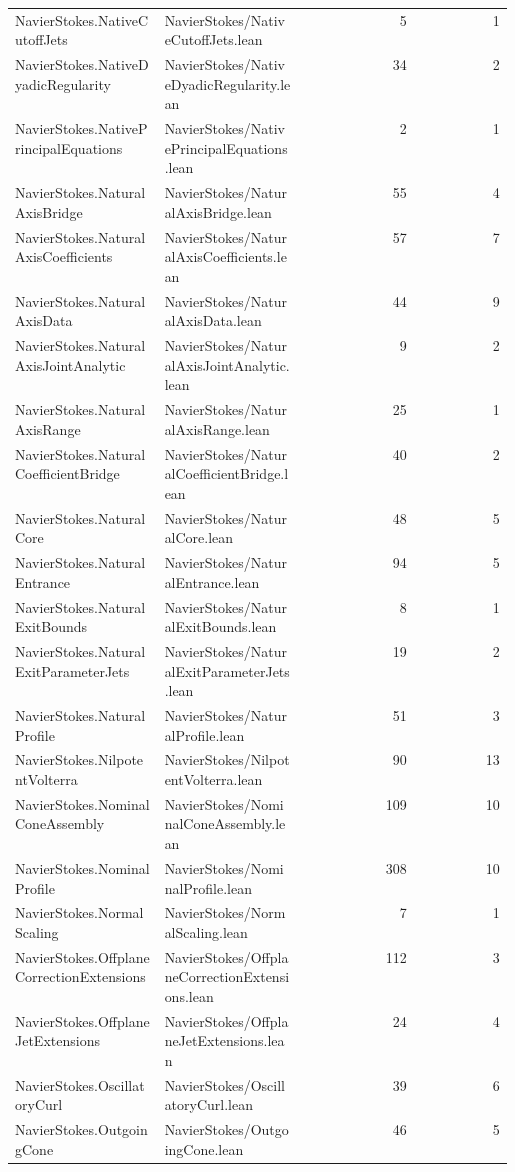 \begin{longtable}{p{0.30\linewidth}p{0.28\linewidth}rr}
NavierStokes.NativeCutoffJets & NavierStokes/NativeCutoffJets.lean & 5 & 1\\
NavierStokes.NativeDyadicRegularity & NavierStokes/NativeDyadicRegularity.lean & 34 & 2\\
NavierStokes.NativePrincipalEquations & NavierStokes/NativePrincipalEquations.lean & 2 & 1\\
NavierStokes.NaturalAxisBridge & NavierStokes/NaturalAxisBridge.lean & 55 & 4\\
NavierStokes.NaturalAxisCoefficients & NavierStokes/NaturalAxisCoefficients.lean & 57 & 7\\
NavierStokes.NaturalAxisData & NavierStokes/NaturalAxisData.lean & 44 & 9\\
NavierStokes.NaturalAxisJointAnalytic & NavierStokes/NaturalAxisJointAnalytic.lean & 9 & 2\\
NavierStokes.NaturalAxisRange & NavierStokes/NaturalAxisRange.lean & 25 & 1\\
NavierStokes.NaturalCoefficientBridge & NavierStokes/NaturalCoefficientBridge.lean & 40 & 2\\
NavierStokes.NaturalCore & NavierStokes/NaturalCore.lean & 48 & 5\\
NavierStokes.NaturalEntrance & NavierStokes/NaturalEntrance.lean & 94 & 5\\
NavierStokes.NaturalExitBounds & NavierStokes/NaturalExitBounds.lean & 8 & 1\\
NavierStokes.NaturalExitParameterJets & NavierStokes/NaturalExitParameterJets.lean & 19 & 2\\
NavierStokes.NaturalProfile & NavierStokes/NaturalProfile.lean & 51 & 3\\
NavierStokes.NilpotentVolterra & NavierStokes/NilpotentVolterra.lean & 90 & 13\\
NavierStokes.NominalConeAssembly & NavierStokes/NominalConeAssembly.lean & 109 & 10\\
NavierStokes.NominalProfile & NavierStokes/NominalProfile.lean & 308 & 10\\
NavierStokes.NormalScaling & NavierStokes/NormalScaling.lean & 7 & 1\\
NavierStokes.OffplaneCorrectionExtensions & NavierStokes/OffplaneCorrectionExtensions.lean & 112 & 3\\
NavierStokes.OffplaneJetExtensions & NavierStokes/OffplaneJetExtensions.lean & 24 & 4\\
NavierStokes.OscillatoryCurl & NavierStokes/OscillatoryCurl.lean & 39 & 6\\
NavierStokes.OutgoingCone & NavierStokes/OutgoingCone.lean & 46 & 5\\

\end{longtable}
